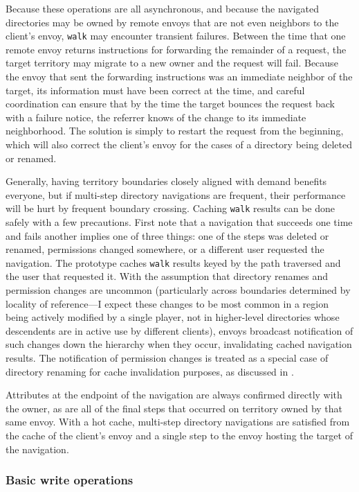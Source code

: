 Because these operations are all asynchronous, and because the navigated directories may be owned by remote envoys that are not even neighbors to the client's envoy, \texttt{walk} may encounter transient failures. Between the time that one remote envoy returns instructions for forwarding the remainder of a request, the target territory may migrate to a new owner and the request will fail. Because the envoy that sent the forwarding instructions was an immediate neighbor of the target, its information must have been correct at the time, and careful coordination can ensure that by the time the target bounces the request back with a failure notice, the referrer knows of the change to its immediate neighborhood. The solution is simply to restart the request from the beginning, which will also correct the client's envoy for the cases of a directory being deleted or renamed.

Generally, having territory boundaries closely aligned with demand benefits everyone, but if multi-step directory navigations are frequent, their performance will be hurt by frequent boundary crossing. Caching \texttt{walk} results can be done safely with a few precautions. First note that a navigation that succeeds one time and fails another implies one of three things: one of the steps was deleted or renamed, permissions changed somewhere, or a different user requested the navigation. The prototype caches \texttt{walk} results keyed by the path traversed and the user that requested it. With the assumption that directory renames and permission changes are uncommon (particularly across boundaries determined by locality of reference---I expect these changes to be most common in a region being actively modified by a single player, not in higher-level directories whose descendents are in active use by different clients), envoys broadcast notification of such changes down the hierarchy when they occur, invalidating cached navigation results. The notification of permission changes is treated as a special case of directory renaming for cache invalidation purposes, as discussed in .

Attributes at the endpoint of the navigation are always confirmed directly with the owner, as are all of the final steps that occurred on territory owned by that same envoy. With a hot cache, multi-step directory navigations are satisfied from the cache of the client's envoy and a single step to the envoy hosting the target of the navigation.

\subsubsection{Basic write operations}

